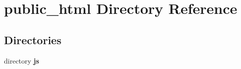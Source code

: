 \section{public\-\_\-html Directory Reference}
\label{dir_46f7f6a2dc4bdceb9ba28beb1cd7588f}
\subsection*{Directories}
\begin{DoxyCompactItemize}
\item 
directory {\bf js}
\end{DoxyCompactItemize}
